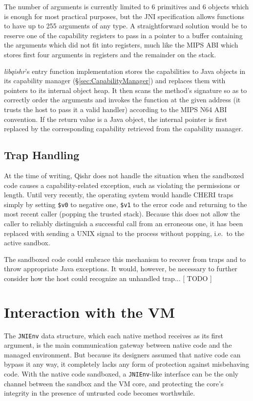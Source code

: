 \documentclass[a4paper,12pt,twoside,openright]{report}
\newcommand{\reg}[1]{\texttt{\$#1}}
\newcommand{\tool}[1]{\emph{#1}}
\newcommand{\lib}[1]{\tool{lib#1}}
\begin{document}
The number of arguments is currently limited to 6 primitives and 6 objects which is enough for most practical purposes, but the JNI specification allows functions to have up to 255 arguments of any type. A straightforward solution would be to reserve one of the capability registers to pass in a pointer to a buffer containing the arguments which did not fit into registers, much like the MIPS ABI which stores first four arguments in registers and the remainder on the stack.

\lib{qishr}'s entry function implementation stores the capabilities to Java objects in its capability manager (\S\ref{sec:CapabilityManager}) and replaces them with pointers to its internal object heap. It then scans the method's signature so as to correctly order the arguments and invokes the function at the given address (it trusts the host to pass it a valid handler) according to the MIPS N64 ABI convention. If the return value is a Java object, the internal pointer is first replaced by the corresponding capability retrieved from the capability manager.

\subsection{Trap Handling}

At the time of writing, Qishr does not handle the situation when the sandboxed code causes a capability-related exception, such as violating the permissions or length. Until very recently, the operating system would handle CHERI traps simply by setting \reg{v0} to negative one, \reg{v1} to the error code and returning to the most recent caller (popping the trusted stack). Because this does not allow the caller to reliably distinguish a successful call from an erroneous one, it has been replaced with sending a UNIX signal to the process without popping, i.e.\ to the active sandbox. 

The sandboxed code could embrace this mechanism to recover from traps and to throw appropriate Java exceptions. It would, however, be necessary to further consider how the host could recognize an unhandled trap... [ TODO ]

\section{Interaction with the VM}

The \texttt{JNIEnv} data structure, which each native method receives as its first argument, is the main communication gateway between native code and the managed environment. But because its designers assumed that native code can bypass it any way, it completely lacks any form of protection against misbehaving code. With the native code sandboxed, a \texttt{JNIEnv}-like interface can be the only channel between the sandbox and the VM core, and protecting the core's integrity in the presence of untrusted code becomes worthwhile.
\end{document}
